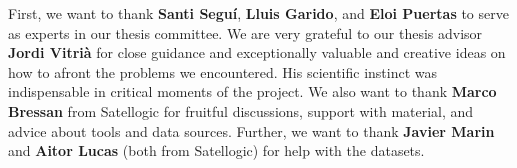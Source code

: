 \documentclass[
11pt, %
english, %
onehalfspacing, %
liststotoc, %
headsepline, %
]{MastersDoctoralThesis} %
\begin{document}
\begin{acknowledgements}
\addchaptertocentry{\acknowledgementname} %

First, we want to thank \textbf{Santi Seguí}, \textbf{Lluis Garido}, and \textbf{Eloi Puertas} to serve as experts in our thesis committee.
We are very grateful to our thesis advisor \textbf{Jordi Vitrià} for close guidance and exceptionally valuable and creative ideas on how to afront the problems we encountered. His scientific instinct was indispensable in critical moments of the project.
We also want to thank \textbf{Marco Bressan} from Satellogic for fruitful discussions, support with material, and advice about tools and data sources. Further, we want to thank \textbf{Javier Marin} and \textbf{Aitor Lucas} (both from Satellogic) for help with the datasets.

\end{acknowledgements}




\mainmatter %

\pagestyle{thesis} %



\tableofcontents



 
 






\appendix %


%
%
%



\printbibliography[heading=bibintoc]


\end{document}

